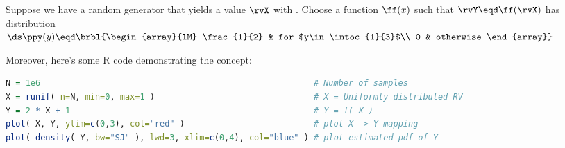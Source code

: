 \begin{example}
\label{ex:ppy_2x1}
Suppose we have a random generator that yields a value $\rvX$ with
.
Choose a function $\ff(x)$ such that $\rvY\eqd\ff(\rvX)$ has distribution
\\\indentx$\ds\ppy(y) \eqd \brbl{\begin{array}{lM}
                              \frac{1}{2} & for $y\in\intoc{1}{3}$\\
                              0           & otherwise
                            \end{array}}$

Moreover, here's some R code demonstrating the concept:
\begin{lstlisting}[language=R]
N = 1e6                                                       # Number of samples
X = runif( n=N, min=0, max=1 )                                # X = Uniformly distributed RV
Y = 2 * X + 1                                                 # Y = f( X )
plot( X, Y, ylim=c(0,3), col="red" )                          # plot X -> Y mapping
plot( density( Y, bw="SJ" ), lwd=3, xlim=c(0,4), col="blue" ) # plot estimated pdf of Y
\end{lstlisting}
\end{example}

